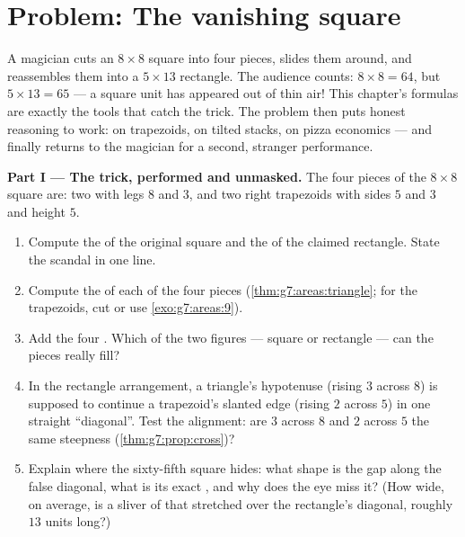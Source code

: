 \section{Problem: The vanishing square}

\begin{problem}[{Weekend problem --- a famous ``proof'' that
$64 = 65$, unmasked by areas and slopes, with pizzas and rings for
dessert}]
\label{pb:g7:areas:1}
A magician cuts an $8 \times 8$ square into four pieces, slides
them around, and reassembles them into a $5 \times 13$ rectangle.
The audience counts: $8 \times 8 = 64$, but
$5 \times 13 = 65$ --- a square unit has appeared out of thin
air! This chapter's  formulas are exactly the tools that
catch the trick. The problem then puts honest  reasoning to
work: on trapezoids, on tilted stacks, on pizza economics --- and
finally returns to the magician for a second,  stranger
performance.

\medskip
\noindent\textbf{Part I --- The trick, performed and unmasked.}
The four pieces of the $8 \times 8$ square are: two  with legs $8$ and $3$, and two right trapezoids with
 sides $5$ and $3$ and height $5$.
\begin{enumerate}
  \item Compute the  of the original square and the  of
        the claimed rectangle. State the scandal in one line.
  \item Compute the  of each of the four pieces
        (\cref{thm:g7:areas:triangle}; for the trapezoids, cut
        or use \cref{exo:g7:areas:9}).
  \item Add the four . Which of the two figures --- square
        or rectangle --- can the pieces really fill?
  \item In the rectangle arrangement, a triangle's hypotenuse
        (rising $3$ across $8$) is supposed to continue a
        trapezoid's slanted edge (rising $2$ across $5$) in one
        straight ``diagonal''. Test the alignment: are $3$ across
        $8$ and $2$ across $5$ the same steepness
        (\cref{thm:g7:prop:cross})?
  \item Explain where the sixty-fifth square hides: what shape is
        the gap along the false diagonal, what is its exact ,
        and why does the eye miss it? (How wide, on average, is a
        sliver of that  stretched over the rectangle's
        diagonal, roughly $13$ units long?)
\end{enumerate}


\end{problem}
